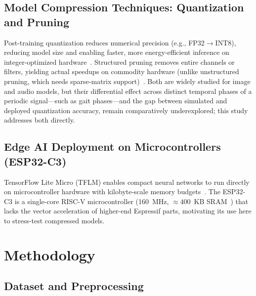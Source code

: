 \documentclass[conference]{IEEEtran}
\begin{document}
\subsection{Model Compression Techniques: Quantization and Pruning}

Post-training quantization reduces numerical precision (e.g., FP32$\to$INT8), reducing model size
and enabling faster, more energy-efficient inference on integer-optimized hardware~\cite{ref3}.
Structured pruning removes entire channels or filters, yielding actual speedups on commodity
hardware (unlike unstructured pruning, which needs sparse-matrix support)~\cite{ref4}. Both are
widely studied for image and audio models, but their differential effect across distinct temporal
phases of a periodic signal---such as gait phases---and the gap between simulated and deployed
quantization accuracy, remain comparatively underexplored; this study addresses both directly.

\subsection{Edge AI Deployment on Microcontrollers (ESP32-C3)}

TensorFlow Lite Micro (TFLM) enables compact neural networks to run directly on microcontroller
hardware with kilobyte-scale memory budgets~\cite{ref5}. The ESP32-C3 is a single-core RISC-V
microcontroller (160~MHz, ${\approx}400$~KB SRAM~\cite{ref6}) that lacks the vector acceleration of
higher-end Espressif parts, motivating its use here to stress-test compressed models.

\section{Methodology}
\label{sec:method}

\subsection{Dataset and Preprocessing}
\end{document}
